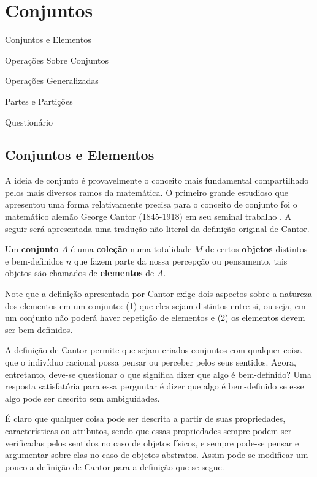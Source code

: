\chapter{Conjuntos}\label{cap:Conjuntos}

\begin{introduction}[Tópicos]
	\item Conjuntos e Elementos
	\item Operações Sobre Conjuntos
	\item Operações Generalizadas
	\item Partes e Partições
	\item Questionário
\end{introduction}

\section{Conjuntos e Elementos}\label{sec:ConjuntoElemento}

A ideia de conjunto é provavelmente o conceito mais fundamental compartilhado pelos mais diversos ramos da matemática. O primeiro grande estudioso que apresentou uma forma relativamente precisa para o conceito de conjunto foi o matemático alemão George Cantor (1845-1918) em seu seminal trabalho \cite{cantor1895}. A seguir será apresentada uma tradução não literal da definição original de Cantor.

\begin{definition}[Cantor]\label{def:ConjuntoCantor}
	Um \textbf{conjunto} $A$ é uma \textbf{coleção} numa totalidade $M$ de certos \textbf{objetos} distintos e bem-definidos $n$ que fazem parte da nossa percepção ou pensamento, tais objetos são chamados de \textbf{elementos} de $A$.
\end{definition}

Note que a definição apresentada por Cantor exige dois aspectos sobre a natureza dos elementos em um conjunto: (1) que eles sejam distintos entre si, ou seja, em um conjunto não poderá haver repetição de elementos e (2) os elementos devem ser bem-definidos. 

A definição de Cantor permite que sejam criados conjuntos com qualquer coisa que o indivíduo racional possa pensar ou perceber pelos seus sentidos. Agora, entretanto, deve-se questionar o que significa dizer que algo é bem-definido? Uma resposta satisfatória para essa perguntar é dizer que algo é bem-definido se esse algo pode ser descrito sem ambiguidades. 

É claro que qualquer coisa pode ser descrita a partir de suas propriedades, características ou atributos, sendo que essas propriedades sempre podem ser verificadas pelos sentidos no caso de objetos físicos, e sempre pode-se pensar e argumentar sobre elas no caso de objetos abstratos. Assim pode-se modificar um pouco a definição de Cantor para a definição que se segue.

